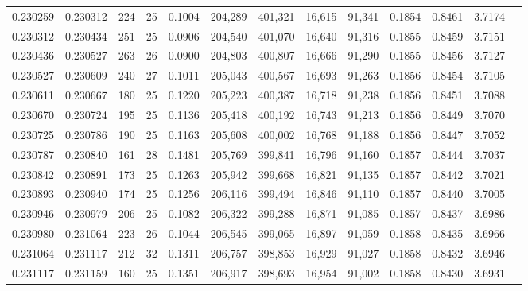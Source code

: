 \begin{tabular}{rrrrrrrrrrrrr}
0.230259 & 0.230312 &   224 &  25 &                                     0.1004 & 204,289 & 401,321 &  16,615 &  91,341 & 0.1854 & 0.8461 & 3.7174 \\
0.230312 & 0.230434 &   251 &  25 &                                     0.0906 & 204,540 & 401,070 &  16,640 &  91,316 & 0.1855 & 0.8459 & 3.7151 \\
0.230436 & 0.230527 &   263 &  26 &                                     0.0900 & 204,803 & 400,807 &  16,666 &  91,290 & 0.1855 & 0.8456 & 3.7127 \\
0.230527 & 0.230609 &   240 &  27 &                                     0.1011 & 205,043 & 400,567 &  16,693 &  91,263 & 0.1856 & 0.8454 & 3.7105 \\
0.230611 & 0.230667 &   180 &  25 &                                     0.1220 & 205,223 & 400,387 &  16,718 &  91,238 & 0.1856 & 0.8451 & 3.7088 \\
0.230670 & 0.230724 &   195 &  25 &                                     0.1136 & 205,418 & 400,192 &  16,743 &  91,213 & 0.1856 & 0.8449 & 3.7070 \\
0.230725 & 0.230786 &   190 &  25 &                                     0.1163 & 205,608 & 400,002 &  16,768 &  91,188 & 0.1856 & 0.8447 & 3.7052 \\
0.230787 & 0.230840 &   161 &  28 &                                     0.1481 & 205,769 & 399,841 &  16,796 &  91,160 & 0.1857 & 0.8444 & 3.7037 \\
0.230842 & 0.230891 &   173 &  25 &                                     0.1263 & 205,942 & 399,668 &  16,821 &  91,135 & 0.1857 & 0.8442 & 3.7021 \\
0.230893 & 0.230940 &   174 &  25 &                                     0.1256 & 206,116 & 399,494 &  16,846 &  91,110 & 0.1857 & 0.8440 & 3.7005 \\
0.230946 & 0.230979 &   206 &  25 &                                     0.1082 & 206,322 & 399,288 &  16,871 &  91,085 & 0.1857 & 0.8437 & 3.6986 \\
0.230980 & 0.231064 &   223 &  26 &                                     0.1044 & 206,545 & 399,065 &  16,897 &  91,059 & 0.1858 & 0.8435 & 3.6966 \\
0.231064 & 0.231117 &   212 &  32 &                                     0.1311 & 206,757 & 398,853 &  16,929 &  91,027 & 0.1858 & 0.8432 & 3.6946 \\
0.231117 & 0.231159 &   160 &  25 &                                     0.1351 & 206,917 & 398,693 &  16,954 &  91,002 & 0.1858 & 0.8430 & 3.6931 \\

\end{tabular}
